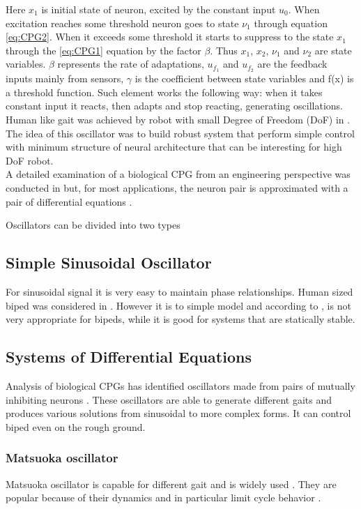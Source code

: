 \documentclass[11pt,a4paper]{report}
\begin{document}
		Here $x_1$  is initial state of neuron, excited by the constant input $u_0$. When excitation reaches some threshold neuron goes to state $\nu_1$ through equation \ref{eq:CPG2}. When it exceeds some threshold it starts to suppress to the state $x_1$ through the \ref{eq:CPG1} equation by the factor $\beta$. Thus $x_1$, $x_2$, $\nu_1$ and $\nu_2$ are state variables. $\beta$ represents the rate of adaptations, $u_{f_1}$ and $u_{f_2}$ are the feedback inputs mainly from sensors, $\gamma$ is the coefficient between state variables and f(x) is a threshold function. Such element works the following way: when it takes constant input it reacts, then adapts and stop reacting, generating oscillations. \\ Human like gait was achieved by robot with small Degree of Freedom (DoF) in \cite{miyakoshi1998three}. The idea of this oscillator was to build robust system that perform simple control with minimum structure of neural architecture that can be interesting for high DoF robot.\\
		A detailed examination of a biological CPG from an engineering perspective was conducted in \cite{zhu2006central} but, for most applications, the neuron pair is approximated with a pair of differential equations \cite{wright2014intelligent}.

		Oscillators can be divided into two types \cite{wright2014intelligent}

		\subsection{Simple Sinusoidal Oscillator}
			For sinusoidal signal it is very easy to maintain phase relationships. Human sized biped was considered in \cite{morimoto2008biologically}. However it is to simple model and according to \cite{wright2014intelligent}, is not very appropriate for bipeds, while it is good for systems that are statically stable. 
		\subsection{Systems of Differential Equations}
			Analysis of biological CPGs has identified oscillators made from pairs of mutually inhibiting neurons \cite{grillner1995neural}. These oscillators are able to generate different gaits and produces various solutions from sinusoidal to more complex forms. It can control biped even on the rough ground.
			\subsubsection{Matsuoka oscillator}
				Matsuoka oscillator is capable for different gait and is widely used \cite{wright2014intelligent}. They are popular because of their dynamics and in particular limit cycle behavior \cite{matsuoka1985sustained}.
				
\end{document}
